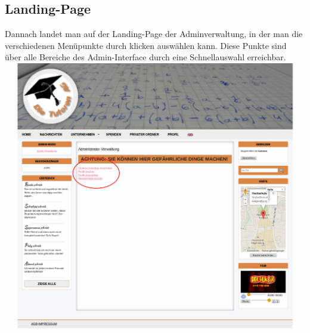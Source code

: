 \subsection{Landing-Page}
Dannach landet man auf der Landing-Page der Adminverwaltung, in der man die verschiedenen Menüpunkte durch klicken auswählen kann. Diese Punkte sind über alle Bereiche des Admin-Interface durch eine Schnellauswahl
erreichbar.\\
\includegraphics[width=1\textwidth]{../Screenshots/de/admin/admin_landing}


